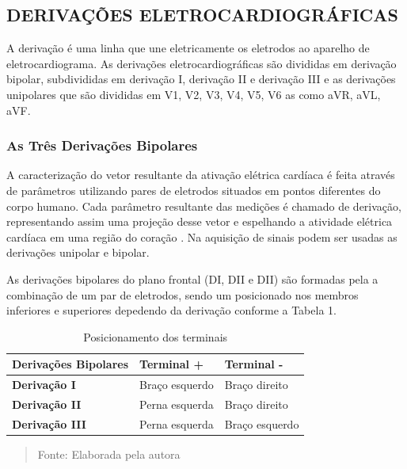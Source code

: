 \documentclass[12pt, a4paper]{article}
\begin{document}
\subsection{DERIVAÇÕES ELETROCARDIOGRÁFICAS}
\hspace*{0.8cm} A derivação é uma linha que une eletricamente os eletrodos ao aparelho de eletrocardiograma. As derivações eletrocardiográficas são divididas em derivação bipolar, subdivididas em derivação I, derivação II e derivação III e as derivações unipolares que são divididas em V1, V2, V3, V4, V5, V6 as como aVR, aVL, aVF.

\subsubsection{As Três Derivações Bipolares}

\hspace*{0.8cm}A caracterização do vetor resultante da ativação elétrica cardíaca é feita através de parâmetros utilizando pares de eletrodos situados em pontos diferentes do corpo humano. Cada parâmetro resultante das medições é chamado de derivação, representando assim uma projeção desse vetor e espelhando a atividade elétrica cardíaca em uma região do coração \cite{webster}. Na aquisição de sinais podem ser usadas as derivações unipolar e bipolar.

As derivações bipolares do plano frontal (DI, DII e DII) são formadas pela a combinação de um par de eletrodos, sendo um posicionado nos membros inferiores e superiores depedendo da derivação conforme a Tabela 1.


\begin{table}[H]
\centering
\caption{Posicionamento dos terminais}
\begin{center}
\begin{tabular}{|l|l|l|}
\hline
\textbf{Derivações Bipolares} & \textbf{Terminal +} & \textbf{Terminal -} \\ \hline
\textbf{Derivação I}          & Braço esquerdo      & Braço direito       \\ \hline
\textbf{Derivação II}         & Perna esquerda      & Braço direito       \\ \hline
\textbf{Derivação III}        & Perna esquerda      & Braço esquerdo      \\ \hline
\end{tabular}
\end{center}
 \vspace*{\fill} 
            \begin{quote}
            \centering 
            \vspace{12pt}Fonte: Elaborada pela autora 
            \end{quote}
            \vspace*{\fill}
			\label{fig:ramcor}
\end{table}
\end{document}
